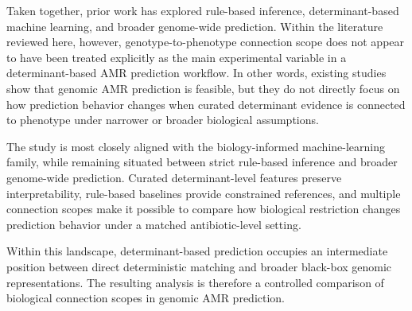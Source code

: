 Taken together, prior work has explored rule-based inference, determinant-based machine learning, and broader genome-wide prediction. Within the literature reviewed here, however, genotype-to-phenotype connection scope does not appear to have been treated explicitly as the main experimental variable in a determinant-based AMR prediction workflow. In other words, existing studies show that genomic AMR prediction is feasible, but they do not directly focus on how prediction behavior changes when curated determinant evidence is connected to phenotype under narrower or broader biological assumptions.

The study is most closely aligned with the biology-informed machine-learning family, while remaining situated between strict rule-based inference and broader genome-wide prediction. Curated determinant-level features preserve interpretability, rule-based baselines provide constrained references, and multiple connection scopes make it possible to compare how biological restriction changes prediction behavior under a matched antibiotic-level setting.

Within this landscape, determinant-based prediction occupies an intermediate position between direct deterministic matching and broader black-box genomic representations. The resulting analysis is therefore a controlled comparison of biological connection scopes in genomic AMR prediction.

